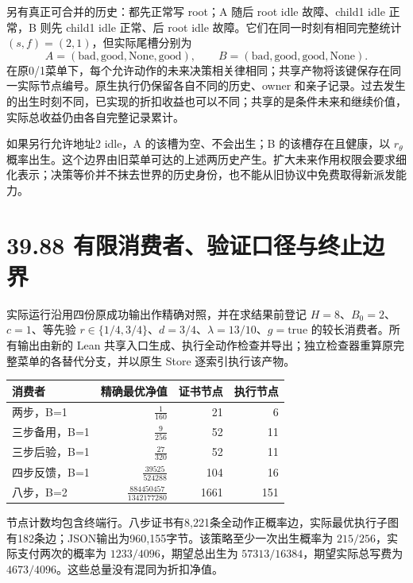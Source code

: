 \documentclass[
  11pt,
  oneside]{book}
\newcounter{none} %
\begin{document}
另有真正可合并的历史：都先正常写 root；A 随后 root idle 故障、child1 idle 正常，B 则先 child1 idle 正常、后 root idle 故障。它们在同一时刻有相同完整统计 \((s,f)=(2,1)\)，但实际尾槽分别为 \[A=(\mathrm{bad},\mathrm{good},\mathrm{None},\mathrm{good}),\qquad
B=(\mathrm{bad},\mathrm{good},\mathrm{good},\mathrm{None}).\] 在原0/1菜单下，每个允许动作的未来决策相关律相同；共享产物将该键保存在同一实际节点编号。原生执行仍保留各自不同的历史、owner 和亲子记录。过去发生的出生时刻不同，已实现的折扣收益也可以不同；共享的是条件未来和继续价值，实际总收益仍由各自完整记录累计。

如果另行允许地址2 idle，A 的该槽为空、不会出生；B 的该槽存在且健康，以 \(r_\theta\) 概率出生。这个边界由旧菜单可达的上述两历史产生。扩大未来作用权限会要求细化表示；决策等价并不抹去世界的历史身份，也不能从旧协议中免费取得新派发能力。

\section{39.88 有限消费者、验证口径与终止边界}\label{ux6709ux9650ux6d88ux8d39ux8005ux9a8cux8bc1ux53e3ux5f84ux4e0eux7ec8ux6b62ux8fb9ux754c}

实际运行沿用四份原成功输出作精确对照，并在求结果前登记 \(H=8\)、\(B_0=2\)、\(c=1\)、等先验 \(r\in\{1/4,3/4\}\)、\(d=3/4\)、\(\lambda=13/10\)、\(g=\mathrm{true}\) 的较长消费者。所有输出由新的 Lean 共享入口生成、执行全动作检查并导出；独立检查器重算原完整菜单的各替代分支，并以原生 Store 逐索引执行该产物。

{\def\LTcaptype{none} %
\begin{longtable}[]{@{}lrrr@{}}
\toprule\noalign{}
消费者 & 精确最优净值 & 证书节点 & 执行节点 \\
\midrule\noalign{}
\endhead
\bottomrule\noalign{}
\endlastfoot
两步，B=1 & \(\frac{1}{160}\) & 21 & 6 \\
三步备用，B=1 & \(\frac{9}{256}\) & 52 & 11 \\
三步后验，B=1 & \(\frac{27}{320}\) & 52 & 11 \\
四步反馈，B=1 & \(\frac{39525}{524288}\) & 104 & 16 \\
八步，B=2 & \(\frac{884450457}{1342177280}\) & 1661 & 151 \\
\end{longtable}
}

节点计数均包含终端行。八步证书有8,221条全动作正概率边，实际最优执行子图有182条边；JSON输出为960,155字节。该策略至少一次出生概率为 \(215/256\)，实际支付两次的概率为 \(1233/4096\)，期望总出生为 \(57313/16384\)，期望实际总写费为 \(4673/4096\)。这些总量没有混同为折扣净值。
\end{document}
